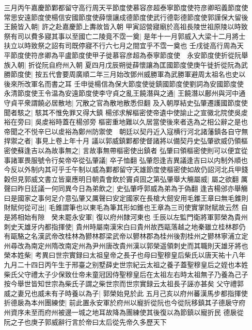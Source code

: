 三月丙午嘉慶節鄴都留守高行周天平節度使慕容彦超泰寧節度使符彦卿昭義節度使常思安遠節度使楊信安國節度使薛懷讓成德節度使武行德彰德節度使郭謹保大留後王饒皆入朝|{
	許之赴嘉慶節上夀故皆入朝}
甲寅詔營寢廟於高祖長陵世祖原陵以時致祭有司以費多寢其事以至國亡二陵竟不霑一奠|{
	是年十一月郭威入大梁十二月將士扶立以時致祭之詔有司既停寢不行六七月之間宜乎不霑一奠也}
壬戌徙高行周為天平節度使符彦卿為平盧節度使甲子徙慕容彦超為泰寧節度使　永安節度使折從阮舉族入朝|{
	折從阮自府州入朝}
夏四月戊辰朔徙薛懷讓為匡國節度使庚午徙折從阮為武勝節度使|{
	按五代會要周廣順二年三月始改鄧州威勝軍為武勝軍避周太祖名也史以後來所改軍名而書之耳}
壬申徙楊信為保大節度使徙鎮國節度使劉詞為安國節度使永清節度使王令温為安遠節度使李守貞之亂王饒潛與之通|{
	王饒潛以鄜州與河中通}
守貞平衆謂饒必居散地|{
	冗散之官為散地散悉但翻}
及入朝厚結史弘肇遷護國節度使聞者駭之|{
	駭其不惟免罪又得大鎮}
楊邠求解樞密使帝遺中使諭止之宣徽北院使吳䖍裕在旁曰|{
	吳䖍裕時蓋在楊邠旁}
樞密重地難以久居當使後來者迭為之相公辭之是也帝聞之不悦辛巳以䖍裕為鄭州防禦使　朝廷以契丹近入寇横行河北諸藩鎮各自守無捍禦之者|{
	事見上卷上年十月}
議以郭威鎮鄴都使督諸將以備契丹史弘肇欲威仍領樞密使蘇逢吉以為故事無之|{
	言故事無帶樞密使出鎮者}
弘肇曰領樞密使則可以便宜從事諸軍畏服號令行矣帝卒從弘肇議|{
	卒子恤翻}
弘肇怨逢吉異議逢吉曰以内制外順也今反以外制内其可乎壬午制以威為鄴都留守天雄節度使樞密使如故仍詔河北兵甲錢糓但見郭威文書立皆稟應明日朝貴會飲於竇貞固之第弘肇舉大觴屬威|{
	屬之欲翻}
厲聲曰昨日廷議一何同異今日為弟飲之|{
	史弘肇呼郭威為弟為于偽翻}
逢吉楊邠亦舉觴曰是國家之事何足介意弘肇又厲聲曰安定國家在長槍大劒安用毛錐王章曰無毛錐則財賦何從可出|{
	毛錐謂筆也以東毛為筆其形如錐也王章為三司使實掌財賦故云然}
自是將相始有隙　癸未罷永安軍|{
	復以府州隸河東也}
壬辰以左監門衛將軍郭榮為貴州刺史天雄牙内都指揮使|{
	貴州時屬南漢宋白曰貴州故西甌落越之地秦雖立桂林郡仍有甌駱之名漢武帝改桂林為鬰林郡梁武帝以鬰林郡為桂州後割桂州之鬰林寧浦立定州尋改為南定州隋改南定州為尹州唐改貴州漢以郭榮遥領刺史而其職則天雄牙將也}
榮本姓柴|{
	考異曰世宗實録曰太祖皇帝之長子也母曰聖穆皇后柴氏以唐天祐十八年九月二十四日丙午生于邢臺之别墅薛史世宗紀云太祖之養子蓋聖穆皇后之姪也本姓柴氏父守禮太子少保致仕帝未童冠因侍聖穆皇后在太祖左右時太祖無子乃養為己子按今舉世皆知世宗為柴氏子謂之柴世宗而世宗實録云太祖長子誣亦甚矣}
父守禮郭威之妻兄也威未有子時養以為子|{
	郭榮始見於此}
五月己亥以府州蕃漢馬步都指揮使折德扆為本州團練使|{
	前此置永安軍於府州以寵折從阮也今從阮移鎮其子德扆守府州資序未至而府州被邊一城之地耳故降為團練使其後復以為節鎮以寵折民}
德扆從阮之子也庚子郭威辭行言於帝曰太后從先帝久多歷天下

